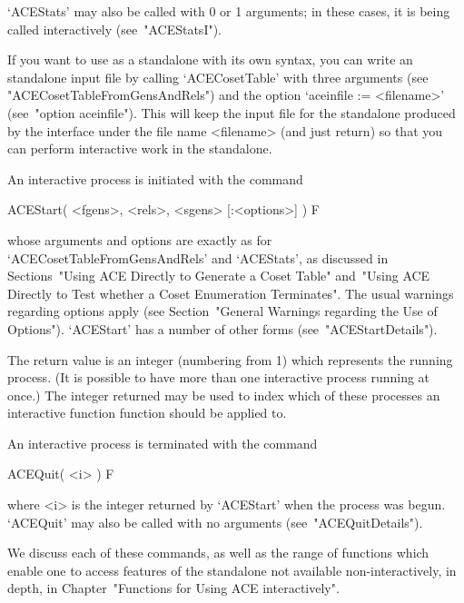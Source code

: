 `ACEStats' may also be called with 0 or 1 arguments; in  these  cases,
it is being called interactively (see~"ACEStatsI").

\enditems


If you want to use {\ACE} as a standalone with its own syntax, you can
write an {\ACE} standalone input file by calling `ACECosetTable'  with
three arguments (see "ACECosetTableFromGensAndRels")  and  the  option
`aceinfile := <filename>' (see~"option aceinfile"). This will keep the
input file for the {\ACE} standalone produced by the {\GAP}  interface
under the file name <filename> (and  just  return)  so  that  you  can
perform interactive work in the standalone.


\beginitems

An interactive {\ACE} process is initiated with the command

\>ACEStart( <fgens>, <rels>, <sgens> [:<options>] ) F

whose    arguments    and    options    are     exactly     as     for
`ACECosetTableFromGensAndRels'  and  `ACEStats',   as   discussed   in
Sections~"Using ACE Directly to Generate a Coset Table" and~"Using ACE
Directly to Test whether a Coset Enumeration  Terminates".  The  usual
warnings  regarding  options  apply  (see  Section~"General   Warnings
regarding the Use of Options"). `ACEStart' has a number of other forms
(see~"ACEStartDetails").

The return value is an integer (numbering from 1) which represents the
running process. (It is possible to have  more  than  one  interactive
process running at once.) The integer returned may be  used  to  index
which of these  processes  an  interactive  function  {\ACE}  function
should be applied to.

An interactive {\ACE} process is terminated with the command

\>ACEQuit( <i> ) F

where <i> is the integer returned by `ACEStart' when the  process  was
begun.   `ACEQuit'   may   also   be   called   with   no    arguments
(see~"ACEQuitDetails").

We discuss each of these commands, as well as the range  of  functions
which enable one to access  features  of  the  {\ACE}  standalone  not
available non-interactively, in depth, in Chapter~"Functions for Using
ACE interactively".

